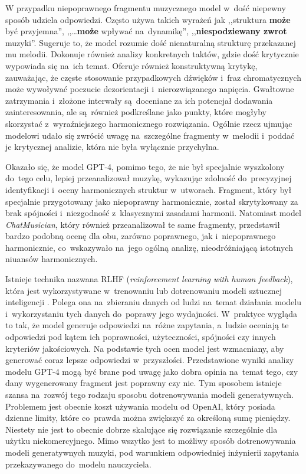 \documentclass[data-science]{agh-wi} %
\begin{document}
W przypadku niepoprawnego fragmentu muzycznego model w~dość niepewny sposób udziela odpowiedzi. Często używa takich wyrażeń jak ,,struktura \textbf{może} być przyjemna'', ,,\dots \textbf{może} wpływać na~dynamikę'', ,,\textbf{niespodziewany zwrot} muzyki''. Sugeruje to, że model rozumie dość nienaturalną strukturę przekazanej mu melodii. Dokonuje również analizy konkretnych taktów, gdzie dość krytycznie wypowiada się na~ich temat. Oferuje również konstruktywną krytykę, zauważając, że częste stosowanie przypadkowych dźwięków i~fraz chromatycznych może wywoływać poczucie dezorientacji i~nierozwiązanego napięcia. Gwałtowne zatrzymania i~złożone interwały są~doceniane za ich potencjał dodawania zainteresowania, ale są~również podkreślane jako punkty, które mogłyby skorzystać z~wyraźniejszego harmonicznego rozwiązania. Ogólnie rzecz ujmując modelowi udało się zwrócić uwagę na~szczególne fragmenty w~melodii i~poddać je krytycznej analizie, która nie była wyłącznie przychylna.

Okazało się, że model GPT-4, pomimo tego, że nie był specjalnie wyszkolony do~tego celu, lepiej przeanalizował muzykę, wykazując zdolność do~precyzyjnej identyfikacji i~oceny harmonicznych struktur w~utworach. Fragment, który był specjalnie przygotowany jako niepoprawny harmonicznie, został skrytykowany za brak spójności i~niezgodność z~klasycznymi zasadami harmonii. Natomiast model \textit{ChatMusician}, który również przeanalizował te same fragmenty, przedstawił bardzo podobną ocenę dla obu, zarówno poprawnego, jak i~niepoprawnego harmonicznie, co~wskazywało na~jego ogólną analizę, nieodróżniającą istotnych niuansów harmonicznych.

Istnieje technika nazwana RLHF (\textit{reinforcement learning with human feedback}), która jest wykorzystywane w~trenowaniu lub dotrenowaniu modeli sztucznej inteligencji \cite{rl_training}. Polega ona na~zbieraniu danych od ludzi na~temat działania modelu i~wykorzystaniu tych danych do~poprawy jego wydajności. W~praktyce wygląda to tak, że model generuje odpowiedzi na~różne zapytania, a~ludzie oceniają te odpowiedzi pod kątem ich poprawności, użyteczności, spójności czy innych kryteriów jakościowych. Na podstawie tych ocen model jest wzmacniany, aby generować coraz lepsze odpowiedzi w~przyszłości. Przedstawione wyniki analizy modelu GPT-4 mogą być brane pod uwagę jako dobra opinia na~temat tego, czy dany wygenerowany fragment jest poprawny czy nie. Tym sposobem istnieje szansa na~rozwój tego rodzaju sposobu dotrenowywania modeli generatywnych. Problemem jest obecnie koszt używania modelu od OpenAI, który posiada dzienne limity, które co~prawda można zwiększyć za określoną sumę pieniędzy. Niestety nie jest to obecnie dobrze skalujące się rozwiązanie szczególnie dla użytku niekomercyjnego. Mimo wszytko jest to możliwy sposób dotrenowywania modeli generatywnych muzyki, pod warunkiem odpowiedniej inżynierii zapytania przekazywanego do~modelu nauczyciela.
\end{document}
